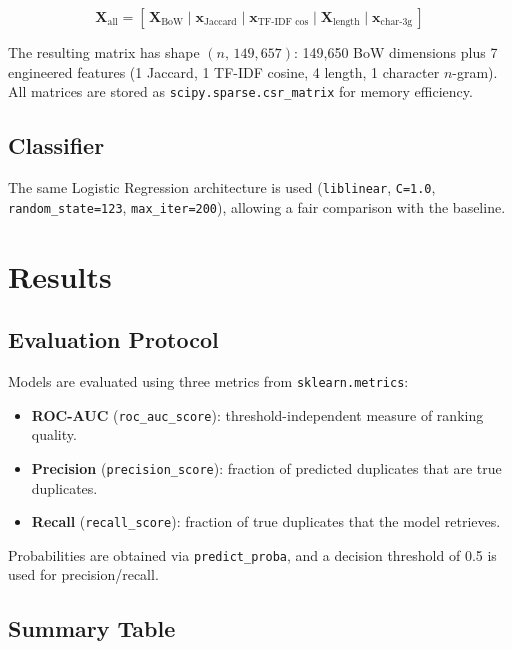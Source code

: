 \documentclass[11pt,a4paper]{article}
\begin{document}
\[
    \mathbf{X}_{\text{all}} = \left[\,
        \mathbf{X}_{\text{BoW}}\;\big|\;
        \mathbf{x}_{\text{Jaccard}}\;\big|\;
        \mathbf{x}_{\text{TF-IDF cos}}\;\big|\;
        \mathbf{X}_{\text{length}}\;\big|\;
        \mathbf{x}_{\text{char-3g}}
    \,\right]
\]

The resulting matrix has shape $(n,\,149{,}657)$: 149{,}650 BoW dimensions plus 7 engineered features (1 Jaccard, 1 TF-IDF cosine, 4 length, 1 character $n$-gram). All matrices are stored as \texttt{scipy.sparse.csr\_matrix} for memory efficiency.

\subsection{Classifier}

The same Logistic Regression architecture is used (\texttt{liblinear}, \texttt{C=1.0}, \texttt{random\_state=123}, \texttt{max\_iter=200}), allowing a fair comparison with the baseline.

\section{Results}
\label{sec:results}

\subsection{Evaluation Protocol}

Models are evaluated using three metrics from \texttt{sklearn.metrics}:

\begin{itemize}[leftmargin=*]
    \item \textbf{ROC-AUC} (\texttt{roc\_auc\_score}): threshold-independent measure of ranking quality.
    \item \textbf{Precision} (\texttt{precision\_score}): fraction of predicted duplicates that are true duplicates.
    \item \textbf{Recall} (\texttt{recall\_score}): fraction of true duplicates that the model retrieves.
\end{itemize}

Probabilities are obtained via \texttt{predict\_proba}, and a decision threshold of 0.5 is used for precision/recall.

\subsection{Summary Table}
\end{document}
